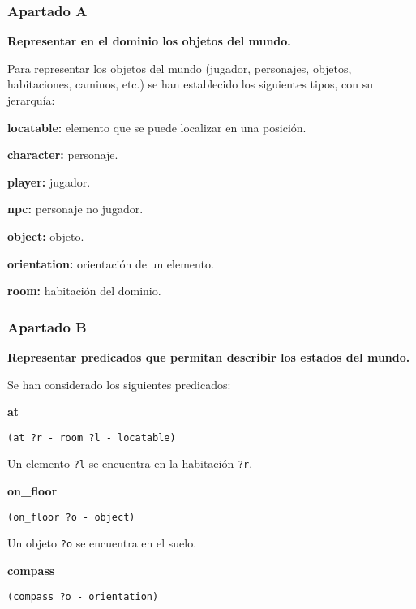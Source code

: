 \documentclass[11pt,a4paper]{article}
\begin{document}
\subsubsection{Apartado A}

\textbf{Representar en el dominio los objetos del mundo.}

\bigskip

Para representar los objetos del mundo (jugador, personajes, objetos, habitaciones, caminos, etc.) se han establecido
los siguientes tipos, con su jerarquía:

\medskip

\textbf{locatable:} elemento que se puede localizar en una posición.
	
\quad \textbf{character:} personaje.

\quad \quad	\textbf{player:} jugador.

\quad \quad \textbf{npc:} personaje no jugador.

\quad \textbf{object:} objeto.

\textbf{orientation:} orientación de un elemento.

\textbf{room:} habitación del dominio.

\subsubsection{Apartado B}

\textbf{Representar predicados que permitan describir los estados del mundo.}

\bigskip

Se han considerado los siguientes predicados:

\medskip

\large{\textbf{at}}

\texttt{(at ?r - room ?l - locatable)}

\smallskip

Un elemento \texttt{?l} se encuentra en la habitación \texttt{?r}. 

\medskip

\large{\textbf{on\_floor}}

\texttt{(on\_floor ?o - object)}

\smallskip

Un objeto \texttt{?o} se encuentra en el suelo. 

\medskip

\large{\textbf{compass}}

\texttt{(compass ?o - orientation)}

\smallskip
\end{document}
